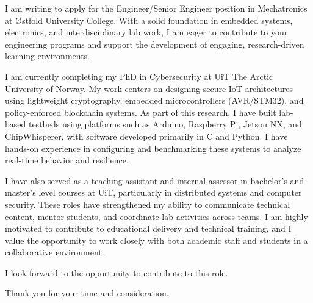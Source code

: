 I am writing to apply for the Engineer/Senior Engineer position in Mechatronics at Østfold University College. With a solid foundation in embedded systems, electronics, and interdisciplinary lab work, I am eager to contribute to your engineering programs and support the development of engaging, research-driven learning environments.

I am currently completing my PhD in Cybersecurity at UiT The Arctic University of Norway. My work centers on designing secure IoT architectures using lightweight cryptography, embedded microcontrollers (AVR/STM32), and policy-enforced blockchain systems. As part of this research, I have built lab-based testbeds using platforms such as Arduino, Raspberry Pi, Jetson NX, and ChipWhisperer, with software developed primarily in C and Python. I have hands-on experience in configuring and benchmarking these systems to analyze real-time behavior and resilience.

I have also served as a teaching assistant and internal assessor in bachelor’s and master’s level courses at UiT, particularly in distributed systems and computer security. These roles have strengthened my ability to communicate technical content, mentor students, and coordinate lab activities across teams. I am highly motivated to contribute to educational delivery and technical training, and I value the opportunity to work closely with both academic staff and students in a collaborative environment.

I look forward to the opportunity to contribute to this role.

Thank you for your time and consideration.